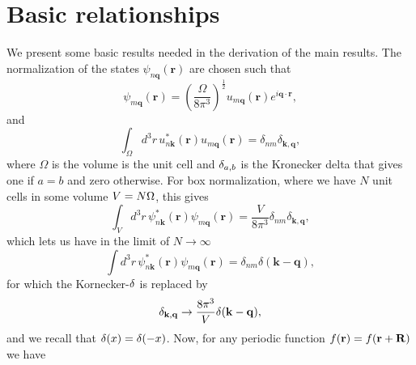 \documentclass[floatfix,prb,aps,superscriptaddress,11pt,preprint]{revtex4}
\begin{document}
\section{Basic relationships}\label{ap_basic}

We present some basic results needed in the derivation of the main
results. 
 The normalization of the
states $\psi_{n\mathbf{q}}(\mathbf{r})$ are chosen such that
\begin{equation}\label{a_uno}
\psi_{m\mathbf{q}}(\mathbf{r})=\left(\frac{\Omega}{8\pi^{3}}\right)^{\frac{1}{2}}u_{m\mathbf{q}}(\mathbf{r})e^{i\mathbf{q}\cdot\mathbf{r}}
,
\end{equation}
and
\begin{equation}\label{a_dos}
\int_{\Omega}d^{3}r\,
u_{n\mathbf{k}}^{*}(\mathbf{r})u_{m\mathbf{q}}(\mathbf{r})=\delta_{nm}\delta_{\mathbf{\mathbf{k},q}}
,
\end{equation}
where $\Omega$ is the volume is the unit cell and $\delta_{a,b}$ is the
Kronecker delta that gives one if $a=b$ and zero otherwise.
For box normalization,
where we have $N$ unit cells in some volume $V=N\Omega$, this gives
\begin{equation}\label{a_tres}
\int_{V}d^{3}r\,\psi_{n\mathbf{k}}^{*}(\mathbf{r})\psi_{m\mathbf{q}}(\mathbf{r})=\frac{V}{8\pi^{3}}\delta_{nm}\delta_{\mathbf{\mathbf{k},q}},
\end{equation}
which lets us have in the limit of $N\rightarrow\infty$
\begin{equation}\label{a_4}
\int
d^{3}r\,\psi_{n\mathbf{k}}^{*}(\mathbf{r})\psi_{m\mathbf{q}}(\mathbf{r})
=\delta_{nm}\delta(\mathbf{k}-\mathbf{q})
,
\end{equation}
for which the Kornecker-$\delta$ is replaced by
\begin{equation}\label{a_5}
\delta_{\mathbf{k},\mathbf{q}}\rightarrow\frac{8\pi^3}{V}\delta(\mathbf{k}-\mathbf{q})
,
\end{equation}
and we recall that $\delta(x)=\delta(-x)$. Now, for any periodic function
$f(\mathbf{r})=f(\mathbf{r}+\mathbf{R})$ we have
\end{document}
